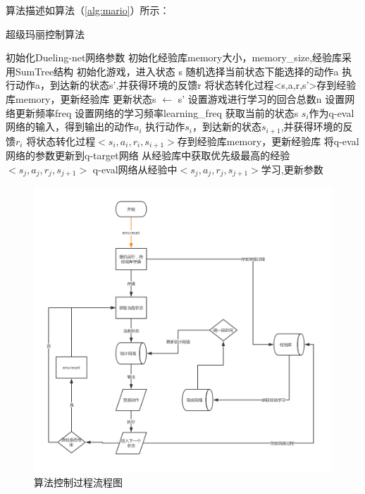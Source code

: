 算法描述如算法（\ref{alg:mario}）所示：
\begin{algorithm}
  \caption{超级玛丽控制算法}
  \begin{algorithmic}[1]
    \State 初始化Dueling-net网络参数
    \State 初始化经验库memory大小，memory\_size,经验库采用SumTree结构
    \State 初始化游戏，进入状态 s
    \State 随机选择当前状态下能选择的动作a
    \State 执行动作a，到达新的状态s',并获得环境的反馈r
    \State 将状态转化过程<s,a,r,s'>存到经验库memory，更新经验库
    \State 更新状态s $\gets$ s'
    \EndWhile
    \State 设置游戏进行学习的回合总数n
    \State 设置网络更新频率freq
    \State 设置网络的学习频率learning\_freq
    \State 获取当前的状态s
    \State $s_i$作为q-eval网络的输入，得到输出的动作$a_i$
    \State 执行动作$s_i$，到达新的状态$s_{i+1}$,并获得环境的反馈$r_i$
    \State 将状态转化过程$<s_i,a_i,r_i,s_{i+1}>$存到经验库memory，更新经验库 
    \State 将q-eval网络的参数更新到q-target网络
    \EndIf
    \State 从经验库中获取优先级最高的经验$<s_j,a_j,r_j,s_{j+1}>$
    \State q-eval网络从经验中$<s_j,a_j,r_j,s_{j+1}>$学习,更新参数
    \EndIf
    \EndFor
  \end{algorithmic}
  \label{alg:mario}
\end{algorithm}
\begin{figure}
  \centering
  \includegraphics[scale=0.4]{static/graph.png}
  \caption{算法控制过程流程图}
\end{figure}
\cleardoublepage

